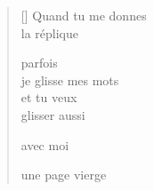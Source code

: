 \documentclass[11pt,a4paper]{article}
\begin{document}
\thispagestyle{empty}


\settowidth{\versewidth}{je glisse mes mots}

\bigskip

\begin{verse}[\versewidth]
  Quand tu me donnes \\
  la réplique

  parfois \\
  je glisse mes mots \\
  et tu veux \\
  glisser aussi

  avec moi

  une page vierge
\end{verse}
\end{document}
